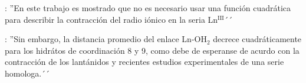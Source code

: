 \cite{Dang2012}: ''En este trabajo es mostrado que no es necesario
usar una funci\'on cuadr\'atica para describir la contracci\'on del
radio i\'onico en la seria Ln$^{\mbox{III}}$´´

\cite{Kuta2010}: ''Sin embargo, la distancia promedio del enlace 
Ln-OH$_2$ decrece cuadr\'aticamente para los hidr\'atos de 
coordinaci\'on 8 y 9, como debe de esperanse de acurdo con la 
contracci\'on de los lant\'anidos y recientes estudios experimentales
de una serie homologa.´´
